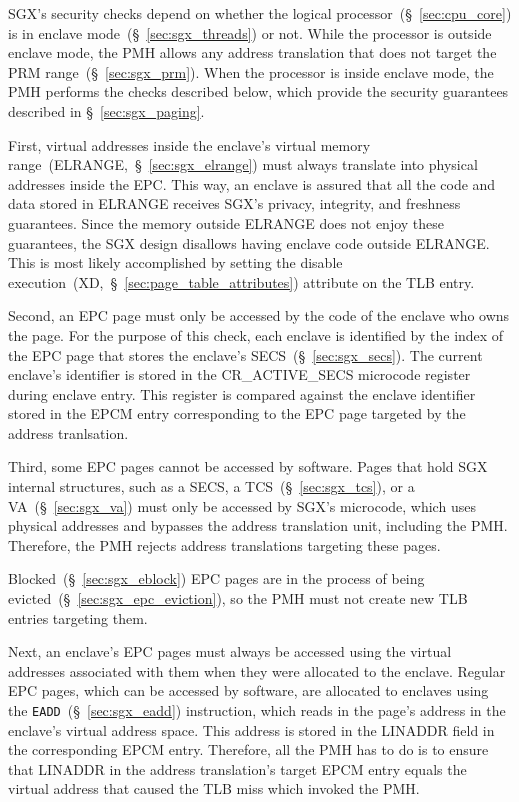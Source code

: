 SGX's security checks depend on whether the logical
processor~(\S~\ref{sec:cpu_core}) is in enclave mode~(\S~\ref{sec:sgx_threads})
or not. While the processor is outside enclave mode, the PMH allows any address
translation that does not target the PRM range~(\S~\ref{sec:sgx_prm}). When the
processor is inside enclave mode, the PMH performs the checks described below,
which provide the security guarantees described in \S~\ref{sec:sgx_paging}.

First, virtual addresses inside the enclave's virtual memory
range~(ELRANGE,~\S~\ref{sec:sgx_elrange}) must always translate into physical
addresses inside the EPC. This way, an enclave is assured that all the code and
data stored in ELRANGE receives SGX's privacy, integrity, and freshness
guarantees. Since the memory outside ELRANGE does not enjoy these guarantees,
the SGX design disallows having enclave code outside ELRANGE. This is most
likely accomplished by setting the disable
execution~(XD,~\S~\ref{sec:page_table_attributes}) attribute on the TLB entry.

Second, an EPC page must only be accessed by the code of the enclave who owns
the page. For the purpose of this check, each enclave is identified by the
index of the EPC page that stores the enclave's SECS~(\S~\ref{sec:sgx_secs}).
The current enclave's identifier is stored in the CR\_ACTIVE\_SECS microcode
register during enclave entry. This register is compared against the enclave
identifier stored in the EPCM entry corresponding to the EPC page targeted by
the address tranlsation.


Third, some EPC pages cannot be accessed by software. Pages that hold SGX
internal structures, such as a SECS, a TCS~(\S~\ref{sec:sgx_tcs}), or a
VA~(\S~\ref{sec:sgx_va}) must only be accessed by SGX's microcode, which uses
physical addresses and bypasses the address translation unit, including the
PMH. Therefore, the PMH rejects address translations targeting these pages.

Blocked~(\S~\ref{sec:sgx_eblock}) EPC pages are in the process of being
evicted~(\S~\ref{sec:sgx_epc_eviction}), so the PMH must not create new TLB
entries targeting them.

Next, an enclave's EPC pages must always be accessed using the virtual
addresses associated with them when they were allocated to the enclave. Regular
EPC pages, which can be accessed by software, are allocated to enclaves using
the \texttt{EADD}~(\S~\ref{sec:sgx_eadd}) instruction, which reads in the
page's address in the enclave's virtual address space. This address is stored
in the LINADDR field in the corresponding EPCM entry. Therefore, all the PMH
has to do is to ensure that LINADDR in the address translation's target EPCM
entry equals the virtual address that caused the TLB miss which invoked the
PMH.

